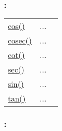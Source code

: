\subsubsection*{: }

\textcolor{blue}{}\begin{tabular}{>{\raggedleft}p{3cm}>{\centering}p{0.5cm}l}
\textcolor{blue}{\hyperlink{cos}{cos()}}&
...&
 \begin{NoHyper} \nameref{par:Cosine} \end{NoHyper}\tabularnewline
\textcolor{blue}{\hyperlink{cosec}{cosec()}}&
...&
 \begin{NoHyper} \nameref{par:Cosecant} \end{NoHyper}\tabularnewline
\textcolor{blue}{\hyperlink{cot}{cot()}}&
...&
 \begin{NoHyper} \nameref{par:Cotangent} \end{NoHyper}\tabularnewline
\textcolor{blue}{\hyperlink{sec}{sec()}}&
...&
 \begin{NoHyper} \nameref{par:Secant} \end{NoHyper}\tabularnewline
\textcolor{blue}{\hyperlink{sin}{sin()}}&
...&
 \begin{NoHyper} \nameref{par:Sine} \end{NoHyper}\tabularnewline
\textcolor{blue}{\hyperlink{tan}{tan()}}&
...&
 \begin{NoHyper} \nameref{par:Tangent} \end{NoHyper}\tabularnewline
\end{tabular}


\subsubsection*{: }

